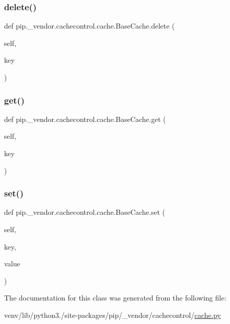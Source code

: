 \subsubsection{\texorpdfstring{delete()}{delete()}}
{\footnotesize\ttfamily def pip.\+\_\+vendor.\+cachecontrol.\+cache.\+Base\+Cache.\+delete (\begin{DoxyParamCaption}\item[{}]{self,  }\item[{}]{key }\end{DoxyParamCaption})}

\mbox{\label{classpip_1_1__vendor_1_1cachecontrol_1_1cache_1_1BaseCache_ad5c273adabffacc22029a8461bdcb8e0}} 
\subsubsection{\texorpdfstring{get()}{get()}}
{\footnotesize\ttfamily def pip.\+\_\+vendor.\+cachecontrol.\+cache.\+Base\+Cache.\+get (\begin{DoxyParamCaption}\item[{}]{self,  }\item[{}]{key }\end{DoxyParamCaption})}

\mbox{\label{classpip_1_1__vendor_1_1cachecontrol_1_1cache_1_1BaseCache_aa36247ddf4e818de3a025bcc3170145c}} 
\subsubsection{\texorpdfstring{set()}{set()}}
{\footnotesize\ttfamily def pip.\+\_\+vendor.\+cachecontrol.\+cache.\+Base\+Cache.\+set (\begin{DoxyParamCaption}\item[{}]{self,  }\item[{}]{key,  }\item[{}]{value }\end{DoxyParamCaption})}



The documentation for this class was generated from the following file\+:\begin{DoxyCompactItemize}
\item 
venv/lib/python3./site-\/packages/pip/\+\_\+vendor/cachecontrol/\hyperlink{__vendor_2cachecontrol_2cache_8py}{cache.\+py}\end{DoxyCompactItemize}
